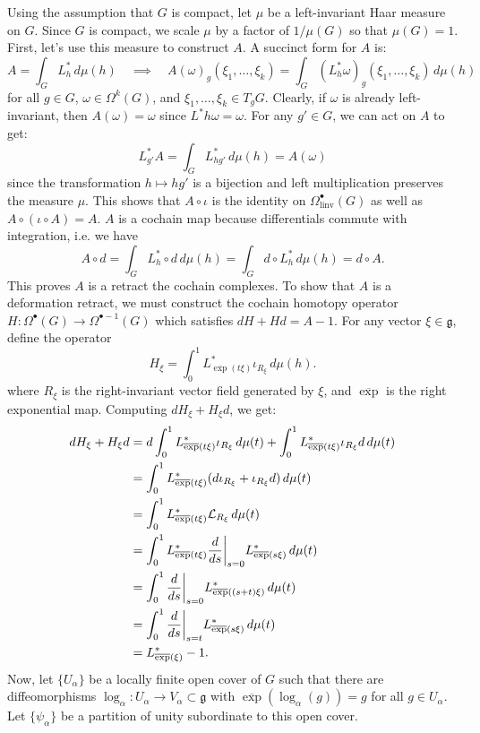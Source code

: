 \documentclass{../../templates/lkx_pset}
\begin{document}
\begin{parts}
	Using the assumption that $G$ is compact, let $\mu$ be a left-invariant Haar measure on $G$. Since $G$ is compact, we scale $\mu$ by a factor of $1/\mu(G)$ so that $\mu(G)=1$.
	First, let's use this measure to construct $A$. A succinct form for $A$ is:
	\[
		A = \int_G L^*_h\,d\mu(h)\quad\implies\quad A(\omega)_g(\xi_1, \ldots, \xi_k) = \int_G (L^*_h \omega)_g ( \xi_1, \ldots, \xi_k)\,d\mu(h)
	\]
	for all $g\in G$, $\omega\in \Omega^k(G)$, and $\xi_1,\ldots, \xi_k\in T_g G$.
	Clearly, if $\omega$ is already left-invariant, then $A(\omega) = \omega$ since $L^*h\omega = \omega$. For any $g'\in G$, we can act on $A$ to get:
	\[
		L_{g'}^* A  = \int_G L^*_{hg'} \,d\mu(h) = A(\omega)
	\]
	since the transformation $h \mapsto hg'$ is a bijection and left multiplication preserves the measure $\mu$. This shows that $A\circ \iota$ is the identity on $\Omega^\bullet_{\textrm{linv}}(G)$ as well as $A\circ (\iota\circ A)=A$. $A$ is a cochain map because differentials commute with integration, i.e. we have
	\[
		A\circ d = \int_G L_h^* \circ d\,d\mu(h) = \int_G d\circ L_h^*\,d\mu(h) = d\circ A.
	\]
	This proves $A$ is a retract the cochain complexes. To show that $A$ is a deformation retract, we must construct the cochain homotopy operator $H : \Omega^\bullet(G) \to \Omega^{\bullet-1}(G)$ which satisfies $dH + Hd=A-1$. For any vector $\xi \in \mathfrak{g}$, define the operator
	\[
		H_\xi = \int_0^1 L^*_{\overline{\exp}(t\xi)} \iota_{R_\xi} \,d\mu(h).
	\]
	where $R_\xi$ is the right-invariant vector field generated by $\xi$, and $\overline{\exp}$ is the right exponential map. Computing $dH_\xi + H_\xi d$, we get:
	\[
		\begin{aligned}
			dH_\xi + H_\xi d & = d\int_0^1 L_{\overline{\exp}(t\xi)}^*\iota_{R_\xi}\,d\mu(t) + \int_0^1 L_{\overline{\exp}(t\xi)}^*\iota_{R_\xi} d\,d\mu(t) \\
			                 & = \int_0^1 L_{\overline{\exp}(t\xi)}^*(d\iota_{R_\xi} + \iota_{R_\xi} d)\,d\mu(t)                                 \\
			                 & = \int_0^1 L_{\overline{\exp}(t\xi)}^* \mathcal{L}_{R_\xi}\,d\mu(t)\\
			                 & = \int_0^1 L_{\overline{\exp}(t\xi)}^* \restr{\frac{d}{ds}}{s=0} L^*_{\overline{\exp}(s\xi)} \,d\mu(t)\\
			                 & = \int_0^1 \restr{\frac{d}{ds}}{s=0} L^*_{\overline{\exp}((s+t)\xi)} \,d\mu(t)\\
			                 & = \int_0^1 \restr{\frac{d}{ds}}{s=t} L^*_{\overline{\exp}(s\xi)} \,d\mu(t)\\
			                 &= L^*_{\overline{\exp}(\xi)} - 1.
		\end{aligned}
	\]
	Now, let $\{U_\alpha\}$ be a locally finite open cover of $G$ such that there are diffeomorphisms $\log_\alpha : U_\alpha \to V_\alpha \subset \mathfrak{g}$ with $\overline{\exp}(\log_\alpha(g))=g$ for all $g\in U_\alpha$. Let $\{\psi_\alpha\}$ be a partition of unity subordinate to this open cover. 


\end{parts}
\end{document}
